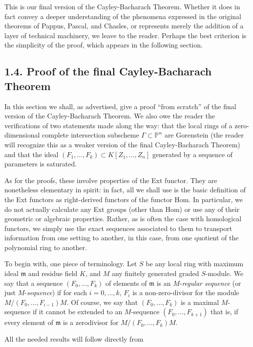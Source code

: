 \documentclass{bull-l}
\theoremstyle{pplain}
\theoremstyle{definition}
\begin{document}
This is our final version of the Cayley-Bacharach Theorem.  Whether it does in
fact convey a deeper understanding of the phenomena expressed in the original 
theorems of Pappus, Pascal, and Chasles, or represents merely the addition of a
layer of technical machinery, we leave to the reader.  Perhaps the best
criterion is the simplicity of the proof, which appears in the following
section.
\subsection*{{\rm 1.4.} Proof of the final Cayley-Bacharach Theorem}
\label{subsec:onefour}
In this section we \nolinebreak 
shall, \linebreak  
as advertised, give a proof ``from scratch'' of the
final version of the Cayley-Bacharach Theorem.  We also owe the reader the
verifications of two statements made along the way: that the local rings of a 
zero-dimensional complete intersection subscheme $\Gamma\subset\mathbb{P}^n$
are Gorenstein (the reader will recognize this as a weaker version of 
the final Cayley-Bacharach Theorem) and that the ideal
$(F_1,\dots,F_k)\subset K[Z_1,\dots,Z_n]$ generated by a sequence of parameters
is saturated.

As for the proofs, these involve properties of the Ext functor.  They are
nonetheless elementary in spirit: in fact, all we shall use is the basic 
definition of the Ext functors as right-derived functors of the functor Hom. 
In particular, we do not actually calculate any Ext groups (other than Hom) or
use any of their geometric or algebraic properties.  Rather, as is often the
case with homological functors, we simply use the exact sequences associated to
them to transport information from one setting to another, in this case, from
one quotient of the polynomial ring to another.

To begin with, one piece of terminology.  Let $S$ be any local ring with
maximum ideal $\mathfrak{m}$ and residue field $K$, and $M$ any finitely
generated graded $S$-module.  We say that a sequence $(F_0,\dots,F_k)$  of 
elements of $\mathfrak{m}$ is an $M$-\emph{regular sequence} (or just 
$M$-\emph{sequence}) if for each $i=0,\dots,k$, $F_i$ is a non-zero-divisor for
the module $M/(F_0,\dots,F_{i-1})M$.  Of course, we say that $(F_0,\dots,F_k)$
is a maximal $M$-sequence if it cannot be extended to an $M$-sequence
$(F_0,\dots,F_{k+1})$ that is, if every element of $\mathfrak{m}$ is a
zerodivisor for $M/(F_0,\dots,F_k)M$.

All the needed results will follow directly from
\end{document}
